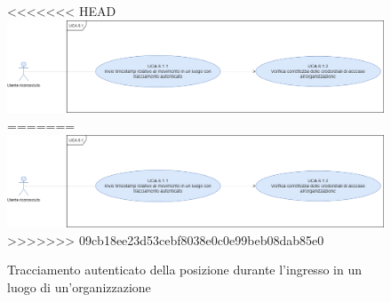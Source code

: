 \begin{figure}[h]
	\centering
<<<<<<< HEAD
	\includegraphics[scale=0.3]{sezioni/UseCase/Immagini/UCA6.1.png}
=======
	\includegraphics[scale=0.4]{sezioni/UseCase/Immagini/UCA6.1.png}
>>>>>>> 09cb18ee23d53cebf8038e0c0e99beb08dab85e0
	\caption{Tracciamento autenticato della posizione durante l'ingresso in un luogo di un'organizzazione}
\end{figure}
